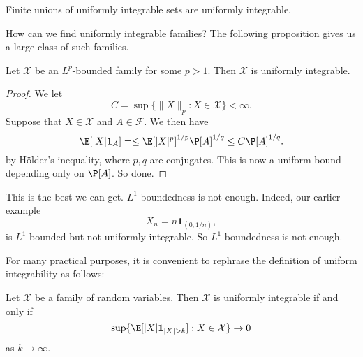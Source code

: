 \documentclass[a4paper]{article}
\begin{document}
\begin{prop}
  Finite unions of uniformly integrable sets are uniformly integrable.
\end{prop}

How can we find uniformly integrable families? The following proposition gives us a large class of such families.

\begin{prop}
  Let $\mathcal{X}$ be an $L^p$-bounded family for some $p > 1$. Then $\mathcal{X}$ is uniformly integrable.
\end{prop}

\begin{proof}
  We let
  \[
    C = \sup\{\|X\|_p : X \in \mathcal{X}\} < \infty.
  \]
  Suppose that $X \in \mathcal{X}$ and $A \in \mathcal{F}$. We then have
  \[
    \E[|X|\mathbf{1}_A] = \leq \E[|X|^p]^{1/p} \P[A]^{1/q} \leq C \P[A]^{1/q}.
  \]
  by H\"older's inequality, where $p, q$ are conjugates. This is now a uniform bound depending only on $\P[A]$. So done.
\end{proof}

This is the best we can get. $L^1$ boundedness is not enough. Indeed, our earlier example
\[
  X_n = n \mathbf{1}_{(0, 1/n)},
\]
is $L^1$ bounded but not uniformly integrable. So $L^1$ boundedness is not enough.

For many practical purposes, it is convenient to rephrase the definition of uniform integrability as follows:

\begin{lemma}
  Let $\mathcal{X}$ be a family of random variables. Then $\mathcal{X}$ is uniformly integrable if and only if
  \[
    \sup\{\E[|X|\mathbf{1}_{|X| > k}]: X \in \mathcal{X}\} \to 0
  \]
  as $k \to \infty$.
\end{lemma}
\end{document}
